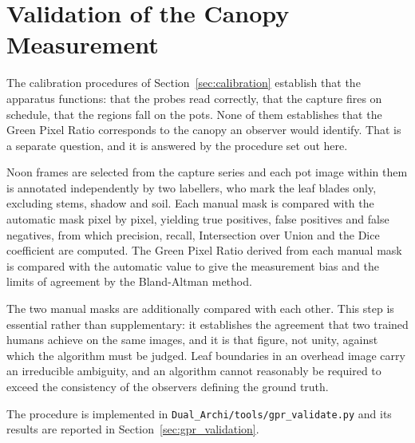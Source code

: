 \section{Validation of the Canopy Measurement}
\label{sec:gpr_validation_method}

The calibration procedures of Section~\ref{sec:calibration} establish that the
apparatus functions: that the probes read correctly, that the capture fires on
schedule, that the regions fall on the pots. None of them establishes that the
Green Pixel Ratio corresponds to the canopy an observer would identify. That
is a separate question, and it is answered by the procedure set out here.

Noon frames are selected from the capture series and each pot image within
them is annotated independently by two labellers, who mark the leaf blades
only, excluding stems, shadow and soil. Each manual mask is compared with the
automatic mask pixel by pixel, yielding true positives, false positives and
false negatives, from which precision, recall, Intersection over Union and the
Dice coefficient are computed. The Green Pixel Ratio derived from each manual
mask is compared with the automatic value to give the measurement bias and the
limits of agreement by the Bland-Altman method.

The two manual masks are additionally compared with each other. This step is
essential rather than supplementary: it establishes the agreement that two
trained humans achieve on the same images, and it is that figure, not unity,
against which the algorithm must be judged. Leaf boundaries in an overhead
image carry an irreducible ambiguity, and an algorithm cannot reasonably be
required to exceed the consistency of the observers defining the ground truth.

The procedure is implemented in \texttt{Dual\_Archi/tools/gpr\_validate.py}
and its results are reported in Section~\ref{sec:gpr_validation}.
